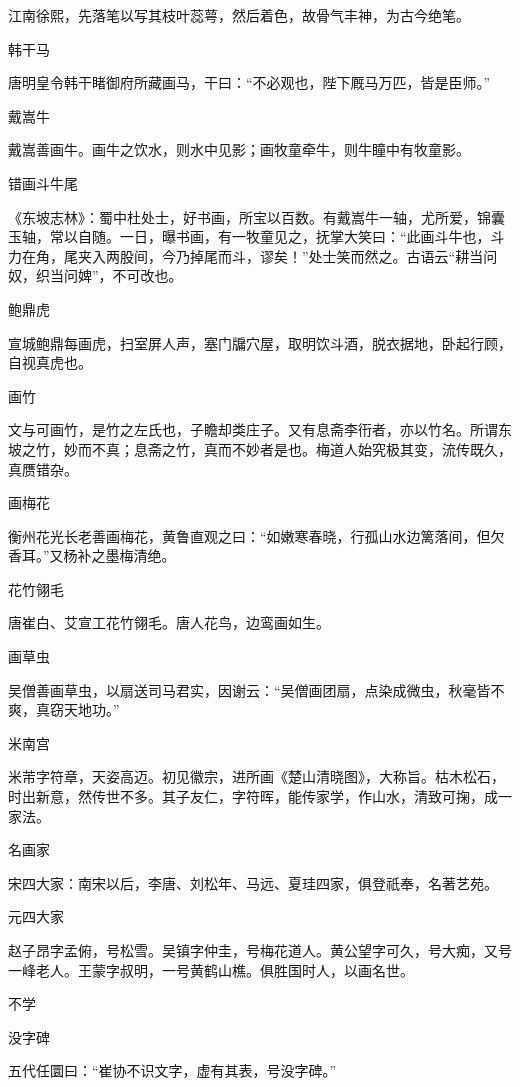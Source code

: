 \documentclass[a4paper,12pt,UTF8,twoside]{ctexbook}
\begin{document}
    江南徐熙，先落笔以写其枝叶蕊萼，然后着色，故骨气丰神，为古今绝笔。
    
    韩干马
    
    唐明皇令韩干睹御府所藏画马，干曰：“不必观也，陛下厩马万匹，皆是臣师。”
    
    戴嵩牛
    
    戴嵩善画牛。画牛之饮水，则水中见影；画牧童牵牛，则牛瞳中有牧童影。
    
    错画斗牛尾
    
    《东坡志林》：蜀中杜处士，好书画，所宝以百数。有戴嵩牛一轴，尤所爱，锦囊玉轴，常以自随。一日，曝书画，有一牧童见之，抚掌大笑曰：“此画斗牛也，斗力在角，尾夹入两股间，今乃掉尾而斗，谬矣！”处士笑而然之。古语云“耕当问奴，织当问婢”，不可改也。
    
    鲍鼎虎
    
    宣城鲍鼎每画虎，扫室屏人声，塞门牖穴屋，取明饮斗酒，脱衣据地，卧起行顾，自视真虎也。
    
    画竹
    
    文与可画竹，是竹之左氏也，子瞻却类庄子。又有息斋李衎者，亦以竹名。所谓东坡之竹，妙而不真；息斋之竹，真而不妙者是也。梅道人始究极其变，流传既久，真赝错杂。
    
    画梅花
    
    衡州花光长老善画梅花，黄鲁直观之曰：“如嫩寒春晓，行孤山水边篱落间，但欠香耳。”又杨补之墨梅清绝。
    
    花竹翎毛
    
    唐崔白、艾宣工花竹翎毛。唐人花鸟，边鸾画如生。
    
    画草虫
    
    吴僧善画草虫，以扇送司马君实，因谢云：“吴僧画团扇，点染成微虫，秋毫皆不爽，真窃天地功。”
    
    米南宫
    
    米芾字符章，天姿高迈。初见徽宗，进所画《楚山清晓图》，大称旨。枯木松石，时出新意，然传世不多。其子友仁，字符晖，能传家学，作山水，清致可掬，成一家法。
    
    名画家
    
    宋四大家：南宋以后，李唐、刘松年、马远、夏珪四家，俱登祇奉，名著艺苑。
    
    元四大家
    
    赵子昂字孟俯，号松雪。吴镇字仲圭，号梅花道人。黄公望字可久，号大痴，又号一峰老人。王蒙字叔明，一号黄鹤山樵。俱胜国时人，以画名世。
    
    不学
    
    没字碑
    
    五代任圜曰：“崔协不识文字，虚有其表，号没字碑。”
    
\end{document}
